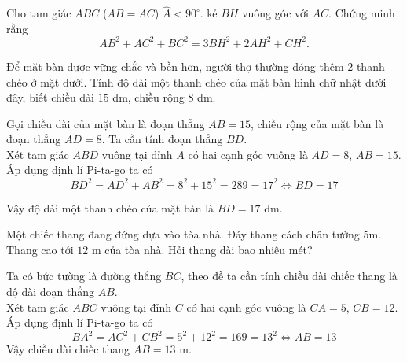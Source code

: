 \begin{vn}
Cho tam giác $ABC$ ($AB=AC$) $\widehat{A}<90^\circ$. kẻ $BH$ vuông góc với $AC$. Chứng minh rằng $$ AB^2+AC^2+BC^2=3BH^2+2AH^2+CH^2. $$
\end{vn}


\begin{vn}%
Để mặt bàn được vững chắc và bền hơn,  người thợ thường đóng thêm $ 2 $ thanh chéo ở mặt dưới. Tính độ dài một thanh chéo của mặt bàn hình chữ nhật dưới đây, biết chiều dài $ 15 $ dm, chiều rộng $ 8 $ dm.
	\loigiai
	{
\immini
{
Gọi chiều dài của mặt bàn là đoạn thẳng $ AB=15 $, chiều rộng của mặt bàn là đoạn thẳng $ AD=8 $. Ta cần tính đoạn thẳng $ BD $.\\
Xét tam giác $ ABD $ vuông tại đỉnh $ A $ có hai cạnh góc vuông là $ AD=8 $, $ AB=15 $. Áp dụng định lí Pi-ta-go ta có
$$ BD^2=AD^2+AB^2=8^2+15^2=289=17^2\Leftrightarrow BD=17$$

}
{
}		
Vậy độ dài một thanh chéo của mặt bàn là $ BD=17 $ dm.	}
\end{vn}
\begin{vn}%
Một chiếc thang đang đứng dựa vào tòa nhà. Đáy thang cách chân tường $ 5 $m. Thang cao tới $ 12 $ m của tòa nhà. Hỏi thang dài bao nhiêu mét?
	\loigiai
	{
\immini
{
Ta có bức tường là đường thẳng $ BC $, theo đề ta cần tính chiều dài chiếc thang là độ dài đoạn thẳng $ AB $.\\
Xét tam giác $ ABC $ vuông tại đỉnh $ C $ có hai cạnh góc vuông là $ CA=5 $, $ CB=12 $. Áp dụng định lí Pi-ta-go ta có
$$ BA^2=AC^2+CB^2=5^2+12^2=169=13^2\Leftrightarrow AB=13$$
Vậy chiều dài chiếc thang $ AB=13 $ m.
}
{
}			}
\end{vn}

